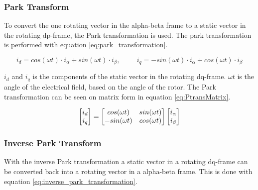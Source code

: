 \subsubsection{Park Transform}
To convert the one rotating vector in the alpha-beta frame to a static vector in the rotating dp-frame, the Park transformation is used. The park transformation is performed with equation \ref{eq:park_transformation}.

\begin{equation}
    i_{d} = cos(\omega t) \cdot i_{\alpha} + sin(\omega t) \cdot i_{\beta}
    , \hspace{1cm}
    i_{q} = -sin(\omega t) \cdot i_{\alpha} + cos(\omega t) \cdot i_{\beta}
    \label{eq:park_transformation}
\end{equation}

$i_d$ and $i_q$ is the components of the static vector in the rotating dq-frame. $\omega t$ is the angle of the electrical field, based on the angle of the rotor.
The Park transformation can be seen on matrix form in equation \ref{eq:PtransMatrix}.


\begin{equation}
    \centering
    \begin{bmatrix}
        i_{d} \\ 
        i_{q}
    \end{bmatrix}
    =
    \begin{bmatrix}
       cos(\omega t) & sin(\omega t) \\
       -sin(\omega t) & cos(\omega t)
    \end{bmatrix}
    \begin{bmatrix}
        i_{\alpha} \\ 
        i_{\beta}
    \end{bmatrix}
    \label{eq:PtransMatrix}
\end{equation}





\subsubsection{Inverse Park Transform}
With the inverse Park transformation a static vector in a rotating dq-frame can be converted back into a rotating vector in a alpha-beta frame. This is done with equation \ref{eq:inverse_park_transformation}.


